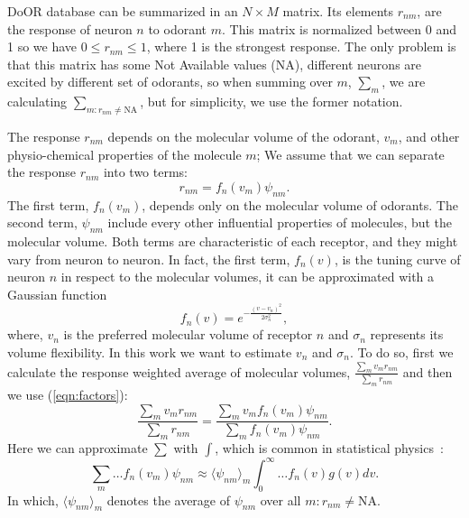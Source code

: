 \documentclass[11pt]{paper} %
\begin{document}
DoOR database can be summarized in an $N\times M$ matrix. 
Its elements $r_{nm}$, are the response of neuron $n$ to odorant $m$. 
This matrix is normalized between 0 and 1 so we have $0 \le r_{nm} \le 1$, where 1 is the strongest response.
The only problem is that this matrix has some Not Available values (NA), 
different neurons are excited by different set of odorants, 
so  when summing over $m$, $\sum_m$, we are calculating $\sum_{m: r_{nm} \neq \text{NA}}$, but for simplicity, 
we use the former notation. 

The response $r_{nm}$ depends on the molecular volume of the odorant, $v_m$, 
and other physio-chemical properties of the molecule $m$; 
We assume that we can separate the response $r_{nm}$ into two terms:
\begin{equation}
	r_{nm} = f_n(v_m) \psi_{nm}.
	\label{eqn:factors}
\end{equation}
The first term, $f_n(v_m)$, depends only on the molecular volume of odorants.
The second term, $\psi_{nm}$ include every other influential properties of molecules, but the molecular volume.
Both terms are characteristic of each receptor, and they might vary from neuron to neuron.
In fact, the first term, $f_n(v)$, is the tuning curve of neuron $n$ in respect to the molecular volumes, 
it can be approximated with a Gaussian function
\begin{equation}
	\displaystyle f_n(v) = e^{-\frac{(v-v_n)^2}{2\sigma^2_n}}, 
	\label{eqn:volume-dependence}
\end{equation}
where, $v_n$ is the preferred molecular volume of receptor $n$ and $\sigma_n$ represents its volume flexibility. 
In this work we want to estimate $v_n$ and $\sigma_n$. 
To do so, first we calculate the response weighted average of molecular volumes, 
$\frac{\sum_{m} v_m r_{nm}}{\sum_{m} r_{nm}}$ and then we use (\ref{eqn:factors}):
\begin{equation}
	\frac{\displaystyle \sum_{m} v_m r_{nm}}{\displaystyle \sum_{m} r_{nm}} = \frac{\displaystyle \sum_{m} v_m f_n(v_m) \psi_{nm}}{\displaystyle \sum_{m} f_n(v_m) \psi_{nm}}.
	\label{eqn:sta}
\end{equation}
Here we can approximate $\sum$ with $\int$, which is common in statistical physics~\cite{}:
\begin{equation}
	\sum_{m} \dots f_n(v_m) \psi_{nm} \approx  \langle \psi_{nm} \rangle_m \int_0^\infty \dots f_n(v) g(v)  dv. 
	\label{eqn:sigma_to_int}
\end{equation}
In which, 
$\langle \psi_{nm} \rangle_m$ denotes the average of $\psi_{nm}$ over all $m: r_{nm} \neq \text{NA}$. 
\end{document}
